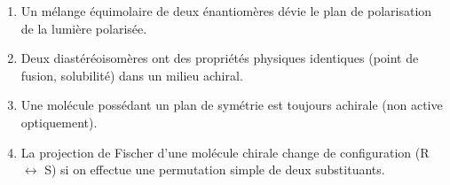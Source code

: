 \documentclass[11pt]{article}
\begin{document}
\begin{exercice}
\begin{enumerate}
    \item Un mélange équimolaire de deux énantiomères dévie le plan de polarisation de la lumière polarisée.
    \item Deux diastéréoisomères ont des propriétés physiques identiques (point de fusion, solubilité) dans un milieu achiral.
    \item Une molécule possédant un plan de symétrie est toujours achirale (non active optiquement).
    \item La projection de Fischer d'une molécule chirale change de configuration (R $\leftrightarrow$ S) si on effectue une permutation simple de deux substituants.
\end{enumerate}
\end{exercice}
\end{document}
